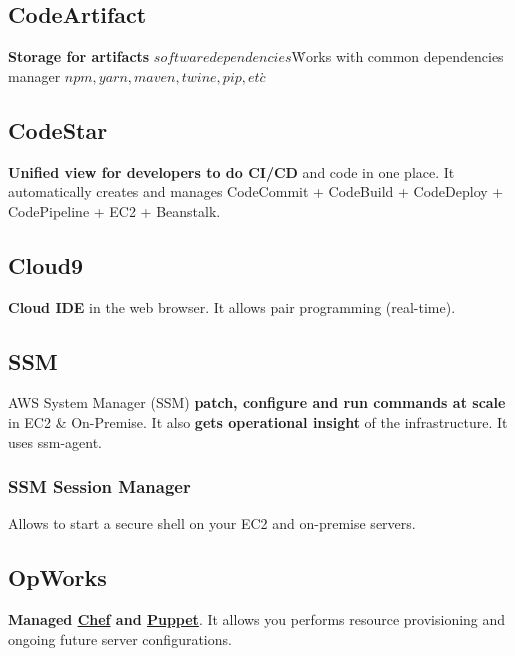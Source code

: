 \subsection{CodeArtifact}\label{subsec:codeartifact}
\textbf{Storage for artifacts} \(software dependencies\)\.
Works with common dependencies manager \(npm, yarn, maven, twine, pip, etc\)\.

\subsection{CodeStar}\label{subsec:codestar}
\textbf{Unified view for developers to do CI/CD} and code in one place.
It automatically creates and manages CodeCommit + CodeBuild + CodeDeploy + CodePipeline + EC2 + Beanstalk.

\subsection{Cloud9}\label{subsec:cloud9}
\textbf{Cloud IDE} in the web browser.
It allows pair programming (real-time).

\subsection{SSM}\label{subsec:ssm}
AWS System Manager (SSM) \textbf{patch, configure and run commands at scale} in EC2 \& On-Premise.
It also \textbf{gets operational insight} of the infrastructure.
It uses ssm-agent.

\subsubsection{SSM Session Manager}
Allows to start a secure shell on your EC2 and on-premise servers.

\subsection{OpWorks}\label{subsec:opworks}
\textbf{Managed \href{https://www.chef.io/}{Chef} and \href{https://www.puppet.com/}{Puppet}}.
It allows you performs resource provisioning and ongoing future server configurations.

